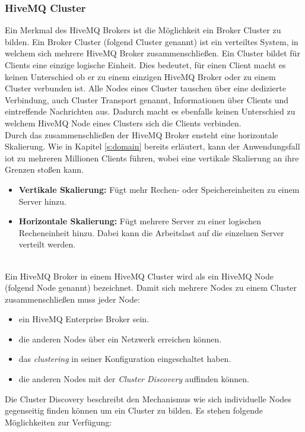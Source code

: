 \subsubsection{HiveMQ Cluster} \label{s:hivemq-cluster}
Ein Merkmal des HiveMQ Brokers ist die Möglichkeit ein Broker Cluster zu bilden.
Ein Broker Cluster (folgend Cluster genannt) ist ein verteiltes System, in welchem sich mehrere HiveMQ Broker zusammenschlie{\ss}en.
Ein Cluster bildet für Clients eine einzige logische Einheit.
Dies bedeutet, für einen Client macht es keinen Unterschied ob er zu einem einzigen HiveMQ Broker oder zu einem Cluster verbunden ist.
Alle Nodes eines Cluster tauschen über eine dedizierte Verbindung, auch Cluster Transport genannt, Informationen über Clients und eintreffende Nachrichten aus. Dadurch macht es ebenfalls keinen Unterschied zu welchem HiveMQ Node eines Clusters sich die Clients verbinden.
\cite{HiveMQClusterHiveMQ}
\\
Durch das zusammenschlie{\ss}en der HiveMQ Broker ensteht eine horizontale Skalierung. Wie in Kapitel \ref{s:domain} bereits erläutert, kann der Anwendungsfall \ac{iot} zu mehreren Millionen Clients führen, wobei eine vertikale Skalierung an ihre Grenzen sto{\ss}en kann.
\begin{itemize}
    \item \textbf{Vertikale Skalierung:} Fügt mehr Rechen- oder Speichereinheiten zu einem Server hinzu.
    \item \textbf{Horizontale Skalierung:} Fügt mehrere Server zu einer logischen Recheneinheit hinzu. Dabei kann die Arbeitslast auf die einzelnen Server verteilt werden.
\end{itemize}
\cite{HowScaleIT}
\\
Ein HiveMQ Broker in einem HiveMQ Cluster wird als ein HiveMQ Node (folgend Node genannt) bezeichnet.
Damit sich mehrere Nodes zu einem Cluster zusammenschlie{\ss}en muss jeder Node:
\begin{itemize}
    \item ein HiveMQ Enterprise Broker sein.
    \item die anderen Nodes über ein Netzwerk erreichen können.
    \item das \textit{clustering} in seiner Konfiguration eingeschaltet haben.
    \item die anderen Nodes mit der \textit{Cluster Discovery} auffinden können.
\end{itemize}
Die Cluster Discovery beschreibt den Mechanismus wie sich individuelle Nodes gegenseitig finden können um ein Cluster zu bilden. Es stehen folgende Möglichkeiten zur Verfügung:
